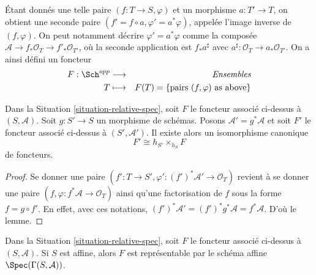 \medskip\noindent
Étant donnés une telle paire
$(f : T \to S, \varphi)$ et un morphisme $a : T' \to T$, on obtient
une seconde paire $(f' = f \circ a, \varphi' = a^*\varphi)$, appelée
l'image inverse de $(f, \varphi)$. On peut notamment décrire
$\varphi' = a^*\varphi$ comme la composée
$\mathcal{A} \to f_*\mathcal{O}_T \to f'_*\mathcal{O}_{T'}$,
où la seconde application est $f_*a^\sharp$ avec
$a^\sharp : \mathcal{O}_T \to a_*\mathcal{O}_{T'}$.
On a ainsi défini un foncteur
\begin{eqnarray}
\label{equation-spec}
F : \Sch^{opp} & \longrightarrow & \textit{Ensembles} \\
T & \longmapsto & F(T) = \{\text{pairs }(f, \varphi) \text{ as above}\}
\nonumber
\end{eqnarray}

\begin{lemma}
\label{lemma-spec-base-change}
Dans la Situation \ref{situation-relative-spec},
soit $F$ le foncteur
associé ci-dessus à $(S, \mathcal{A})$.
Soit $g : S' \to S$ un morphisme de schémas.
Posons $\mathcal{A}' = g^*\mathcal{A}$ et soit $F'$ le
foncteur associé ci-dessus à $(S', \mathcal{A}')$.
Il existe alors un isomorphisme canonique
$$
F' \cong h_{S'} \times_{h_S} F
$$
de foncteurs.
\end{lemma}

\begin{proof}
Se donner une paire $(f' : T \to S', \varphi' : (f')^*\mathcal{A}' \to \mathcal{O}_T)$
revient à se donner une paire $(f, \varphi : f^*\mathcal{A} \to \mathcal{O}_T)$
ainsi qu'une factorisation de $f$ sous la forme
$f = g \circ f'$. En effet, avec ces notations,
$(f')^* \mathcal{A}' = (f')^*g^*\mathcal{A} = f^*\mathcal{A}$.
D'où le lemme.
\end{proof}

\begin{lemma}
\label{lemma-spec-affine}
Dans la Situation \ref{situation-relative-spec}, soit $F$ le foncteur
associé ci-dessus à $(S, \mathcal{A})$.
Si $S$ est affine, alors $F$ est représentable par le
schéma affine $\Spec(\Gamma(S, \mathcal{A}))$.
\end{lemma}

